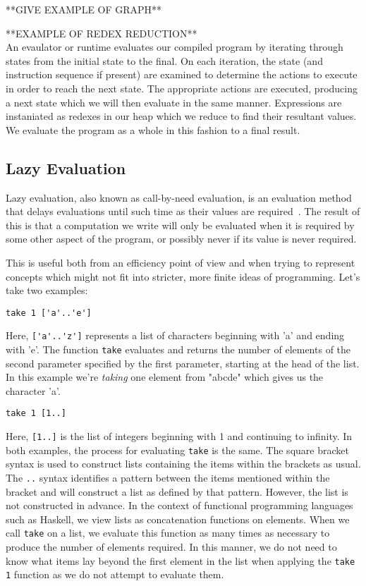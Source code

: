 **GIVE EXAMPLE OF GRAPH**

**EXAMPLE OF REDEX REDUCTION** \\

An evaulator or runtime evaluates our compiled program by iterating through
states from the initial state to the final. On each iteration, the state
(and instruction sequence if present) are examined to determine the actions
to execute in order to reach the next state. The appropriate actions are
executed, producing a next state which we will then evaluate in the same
manner. Expressions are instaniated as redexes in our heap which we reduce
to find their resultant values. We evaluate the program as a whole in this
fashion to a final result.

\subsection{Lazy Evaluation}
Lazy evaluation, also known as call-by-need evaluation, is an evaluation method
that delays evaluations until such time as their values are required~\cite[pp.33]{SPJ}. 
The result of this is that a computation we write will only be 
evaluated when it is required by some other aspect of the program, or possibly never
if its value is never required. 

This is useful both from an efficiency point of view and when trying to 
represent concepts which might not fit into stricter, more finite ideas of
programming. Let's take two examples:

\begin{center}
	\verb!take 1 ['a'..'e']!
\end{center}

\noindent Here, \verb!['a'..'z']! represents a list of characters beginning with 'a' and 
ending with 'e'. The function \verb!take! evaluates and returns the number of
elements of the second parameter specified by the first parameter, starting at the
head of the list. In this example we're \emph{taking} one element from "abcde" which
gives us the character 'a'. 

\begin{center}
	\verb!take 1 [1..]!
\end{center}

\noindent Here, \verb![1..]! is the list of integers beginning with 1 and continuing 
to infinity. In both examples, the process for evaluating  \verb!take! is the same. 
The square bracket
syntax is used to construct lists containing the items within the brackets as usual.
The \verb!..! syntax identifies a pattern between the items mentioned within the
bracket and will construct a list as defined by that pattern. However, the list is
not constructed in advance. In the context of functional programming languages such
as Haskell, we view lists as concatenation functions on elements. When we call
\verb!take! on a list, we evaluate this function as many times as
necessary to produce the number of elements required. In this manner, we do not
need to know what items lay beyond the first element in the list when applying the
\verb!take 1! function as we do not attempt to evaluate them.


